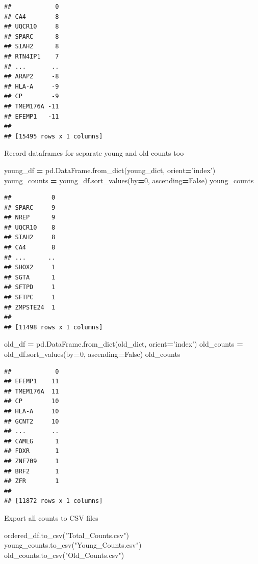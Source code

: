 \documentclass[
]{article}
\newenvironment{Shaded}{\begin{snugshade}}{\end{snugshade}}
\newcommand{\DecValTok}[1]{\textcolor[rgb]{0.00,0.00,0.81}{#1}}
\newcommand{\NormalTok}[1]{#1}
\newcommand{\OperatorTok}[1]{\textcolor[rgb]{0.81,0.36,0.00}{\textbf{#1}}}
\newcommand{\StringTok}[1]{\textcolor[rgb]{0.31,0.60,0.02}{#1}}
\newcommand{\VariableTok}[1]{\textcolor[rgb]{0.00,0.00,0.00}{#1}}
\begin{document}
\begin{verbatim}
##            0
## CA4        8
## UQCR10     8
## SPARC      8
## SIAH2      8
## RTN4IP1    7
## ...       ..
## ARAP2     -8
## HLA-A     -9
## CP        -9
## TMEM176A -11
## EFEMP1   -11
## 
## [15495 rows x 1 columns]
\end{verbatim}

Record dataframes for separate young and old counts too

\begin{Shaded}
\begin{Highlighting}[]
\NormalTok{young_df }\OperatorTok{=}\NormalTok{ pd.DataFrame.from_dict(young_dict, orient}\OperatorTok{=}\StringTok{'index'}\NormalTok{)}
\NormalTok{young_counts }\OperatorTok{=}\NormalTok{ young_df.sort_values(by}\OperatorTok{=}\DecValTok{0}\NormalTok{, ascending}\OperatorTok{=}\VariableTok{False}\NormalTok{)}
\NormalTok{young_counts}
\end{Highlighting}
\end{Shaded}

\begin{verbatim}
##           0
## SPARC     9
## NREP      9
## UQCR10    8
## SIAH2     8
## CA4       8
## ...      ..
## SHOX2     1
## SGTA      1
## SFTPD     1
## SFTPC     1
## ZMPSTE24  1
## 
## [11498 rows x 1 columns]
\end{verbatim}

\begin{Shaded}
\begin{Highlighting}[]
\NormalTok{old_df }\OperatorTok{=}\NormalTok{ pd.DataFrame.from_dict(old_dict, orient}\OperatorTok{=}\StringTok{'index'}\NormalTok{)}
\NormalTok{old_counts }\OperatorTok{=}\NormalTok{ old_df.sort_values(by}\OperatorTok{=}\DecValTok{0}\NormalTok{, ascending}\OperatorTok{=}\VariableTok{False}\NormalTok{)}
\NormalTok{old_counts}
\end{Highlighting}
\end{Shaded}

\begin{verbatim}
##            0
## EFEMP1    11
## TMEM176A  11
## CP        10
## HLA-A     10
## GCNT2     10
## ...       ..
## CAMLG      1
## FDXR       1
## ZNF709     1
## BRF2       1
## ZFR        1
## 
## [11872 rows x 1 columns]
\end{verbatim}

Export all counts to CSV files

\begin{Shaded}
\begin{Highlighting}[]
\NormalTok{ordered_df.to_csv(}\StringTok{"Total_Counts.csv"}\NormalTok{)}
\NormalTok{young_counts.to_csv(}\StringTok{"Young_Counts.csv"}\NormalTok{)}
\NormalTok{old_counts.to_csv(}\StringTok{"Old_Counts.csv"}\NormalTok{)}
\end{Highlighting}
\end{Shaded}
\end{document}
